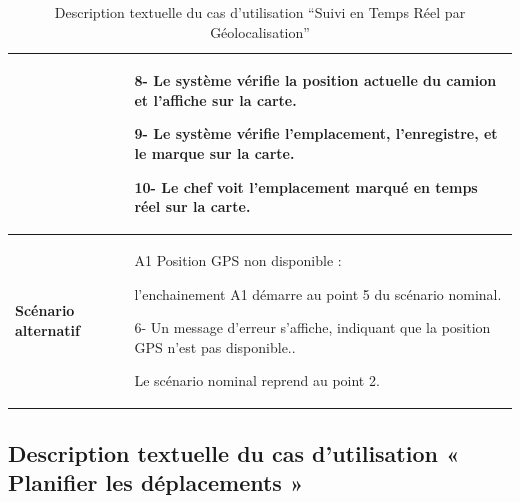 \begin{table}[H]
    \centering
    \renewcommand{\arraystretch}{1}
    \begin{tabular}{|p{4cm}|p{9cm}|}



                                     & 8- Le système vérifie la position actuelle du camion et l'affiche sur la carte.\newline



        9- Le système vérifie l'emplacement, l'enregistre, et le marque sur la carte.\newline


        10- Le chef voit l'emplacement marqué en temps réel sur la carte.                                                      \\


        \hline
        \textbf{Scénario alternatif} & A1 Position GPS non disponible : \newline

        l'enchainement A1 démarre au point 5 du scénario nominal.\newline

        6- Un message d'erreur s'affiche, indiquant que la position GPS n'est pas disponible.. \newline

        Le scénario nominal reprend au point 2.                                                                                \\

        \hline
    \end{tabular}
    \caption{Description textuelle du cas d’utilisation “Suivi en Temps Réel par Géolocalisation”}

\end{table}



\newpage
\subsection{Description textuelle du cas d’utilisation « Planifier les déplacements »}


